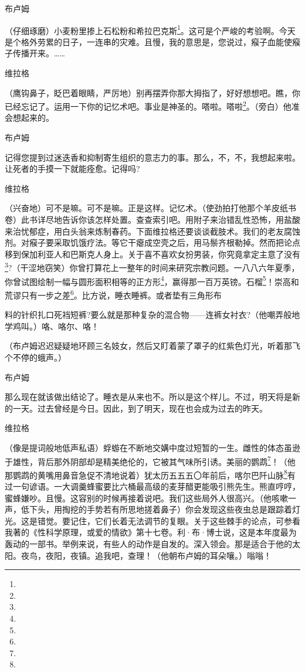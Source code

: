 \par 布卢姆
\par （仔细琢磨）小麦粉里掺上石松粉和希拉巴克斯\footnote{}。这可是个严峻的考验啊。今天是个格外劳累的日子，一连串的灾难。且慢，我的意思是，您说过，瘊子血能使瘊子传播开来。……
\par 维拉格
\par （鹰钩鼻子，眨巴着眼睛，严厉地）别再摆弄你那大拇指了，好好想想吧。瞧，你已经忘记了。运用一下你的记忆术吧。事业是神圣的。嗒啦。嗒啦\footnote{}。（旁白）他准会想起来的。
\par 布卢姆
\par 记得您提到过迷迭香和抑制寄生组织的意志力的事。那么，不，不，我想起来啦。让死者的手摸一下就能痊愈。记得吗?
\par 维拉格
\par （兴奋地）可不是嘛。可不是嘛。正是这样。记忆术。（使劲拍打他那个羊皮纸书卷）此书详尽地告诉你该怎样处置。查查索引吧。用附子来治错乱性恐怖，用盐酸来治忧郁症，用白头翁来炼制春药。下面维拉格还要谈谈截肢术。我们的老友腐蚀剂。对瘊子要采取饥饿疗法。等它干瘪成空壳之后，用马鬃齐根勒掉。然而把论点移到保加利亚人和巴斯克人身上。关于喜不喜欢女扮男装，你究竟拿定主意了没有\footnote{}?（干涩地窃笑）你曾打算花上一整年的时间来研究宗教问题。一八八六年夏季，你曾试图绘制一幅与圆形面积相等的正方形\footnote{}，赢得那一百万英镑。石榴\footnote{}！崇高和荒谬只有一步之差\footnote{}。比方说，睡衣睡裤。或者垫有三角形布
\par 料的针织扎口死裆短裤?要么就是那种复杂的混合物——连裤女衬衣?（他嘲弄般地学鸡叫。）咯、咯尔、咯！
\par （布卢姆迟迟疑疑地环顾三名妓女，然后又盯着蒙了罩子的红紫色灯光，听着那飞个不停的蛾声。）
\par 布卢姆
\par 那么现在就该做出结论了。睡衣是从来也不。所以是这个样儿。不过，明天将是新的一天。过去曾经是今日。因此，到了明天，现在也会成为过去的昨天。
\par 维拉格
\par （像是提词般地低声私语）蜉蝣在不断地交媾中度过短暂的一生。雌性的体态虽逊于雄性，背后那外阴部却是精美绝伦的，它被其气味所引诱。美丽的鹦鹉\footnote{}！（他那鹦鹉的黄嘴用鼻音急促不清地说着）犹太历五五五〇年前后，喀尔巴阡山脉\footnote{}有过一句谚语。一大调羹蜂蜜要比六桶最高级的麦芽醋更能吸引熊先生。熊直哼哼，蜜蜂嫌吵。且慢。这容别的时候再接着说吧。我们这些局外人很高兴。（他咳嗽一声，低下头，用掏挖的手势若有所思地搓着鼻子）你会发现这些夜虫总是跟踪着灯光。这是错觉。要记住，它们长着无法调节的复眼。关于这些棘手的论点，可参看我著的《性科学原理，或爱的情欲》第十七卷。利·布·博士说，这是本年度最为轰动的一部书。举例来说，有些人的动作是自发的。深入领会。那是适合于他的太阳。夜鸟，夜阳，夜镇。追我吧，查理！（他朝布卢姆的耳朵嚷。）嗡嗡！
